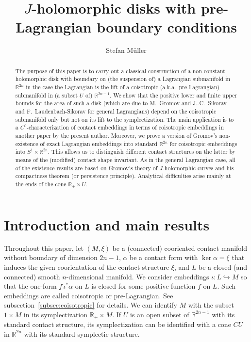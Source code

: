 \documentclass{amsart}
\title[Holomorphic disks with pre-Lagrangian boundary]{$J$-holomorphic disks with pre-Lagrangian boundary conditions}
\author{Stefan M\"uller}
\theoremstyle{remark}
\def\R{{\mathbb R}}
\begin{document}
\thispagestyle{plain}

\begin{abstract}
The purpose of this paper is to carry out a classical construction of a non-constant holomorphic disk with boundary on (the suspension of) a Lagrangian submanifold in $\R^{2 n}$ in the case the Lagrangian is the lift of a coisotropic (a.k.a.\ pre-Lagrangian) submanifold in (a subset $U$ of) $\R^{2 n - 1}$.
We show that the positive lower and finite upper bounds for the area of such a disk (which are due to M.~Gromov and J.-C.~Sikorav and F.~Laudenbach-Sikorav for general Lagrangians) depend on the coisotropic submanifold only but not on its lift to the symplectization.
The main application is to a $C^0$-characterization of contact embeddings in terms of coisotropic embeddings in another paper by the present author.
Moreover, we prove a version of Gromov's non-existence of exact Lagrangian embeddings into standard $\R^{2 n}$ for coisotropic embeddings into $S^1 \times \R^{2 n}$.
This allows us to distinguish different contact structures on the latter by means of the (modified) contact shape invariant.
As in the general Lagrangian case, all of the existence results are based on Gromov's theory of $J$-holomorphic curves and his compactness theorem (or persistence principle).
Analytical difficulties arise mainly at the ends of the cone $\R_+ \times U$.
\end{abstract}

\maketitle

\section{Introduction and main results} \label{sec:intro}

Throughout this paper, let $(M, \xi)$ be a (connected) cooriented contact manifold without boundary of dimension $2 n - 1$, $\alpha$ be a contact form with $\ker \alpha = \xi$ that induces the given coorientation of the contact structure $\xi$, and $L$ be a closed (and connected) smooth $n$-dimensional manifold.
We consider embeddings $\iota \colon L \hookrightarrow M$ so that the one-form $f \, \iota^* \alpha$ on $L$ is closed for some positive function $f$ on $L$.
Such embeddings are called coisotropic or pre-Lagrangian.
See subsection~\ref{subsec:coisotropic} for details.
We can identify $M$ with the subset $1 \times M$ in its symplectization $\R_+ \times M$.
If $U$ is an open subset of $\R^{2 n - 1}$ with its standard contact structure, its symplectization can be identified with a cone $CU$ in $\R^{2 n}$ with its standard symplectic structure.
\end{document}
